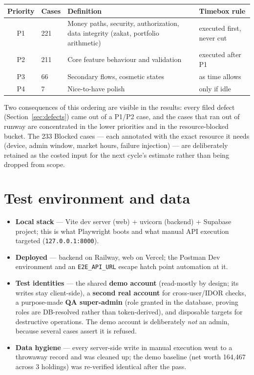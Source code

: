 \documentclass[11pt,a4paper]{article}
\begin{document}
\begin{center}
\small
\begin{tabularx}{\textwidth}{clLl}
\toprule
\textbf{Priority} & \textbf{Cases} & \textbf{Definition} & \textbf{Timebox rule} \\
\midrule
P1 & 221 & Money paths, security, authorization, data integrity (zakat, portfolio arithmetic) & executed first, never cut \\
P2 & 211 & Core feature behaviour and validation & executed after P1 \\
P3 & 66 & Secondary flows, cosmetic states & as time allows \\
P4 & 7 & Nice-to-have polish & only if idle \\
\bottomrule
\end{tabularx}
\end{center}

Two consequences of this ordering are visible in the results: every filed
defect (Section~\ref{sec:defects}) came out of a P1/P2 case, and the cases that
ran out of runway are concentrated in the lower priorities and in the
resource-blocked bucket. The 233 Blocked cases --- each annotated with the
exact resource it needs (device, admin window, market hours, failure
injection) --- are deliberately retained as the costed input for the next
cycle's estimate rather than being dropped from scope.

\section{Test environment and data}

\begin{itemize}
  \item \textbf{Local stack} --- Vite dev server (web) + uvicorn (backend) +
        Supabase project; this is what Playwright boots and what manual API
        execution targeted (\texttt{127.0.0.1:8000}).
  \item \textbf{Deployed} --- backend on Railway, web on Vercel; the Postman Dev
        environment and an \texttt{E2E\_API\_URL} escape hatch point automation at it.
  \item \textbf{Test identities} --- the shared \textbf{demo account} (read-mostly by
        design; its writes stay client-side), a \textbf{second real account} for
        cross-user/IDOR checks, a purpose-made \textbf{QA super-admin} (role granted
        in the database, proving roles are DB-resolved rather than
        token-derived), and disposable targets for destructive operations. The
        demo account is deliberately \emph{not} an admin, because several cases
        assert it is refused.
  \item \textbf{Data hygiene} --- every server-side write in manual execution went
        to a throwaway record and was cleaned up; the demo baseline (net worth
        164{,}467 across 3 holdings) was re-verified identical after the pass.
\end{itemize}
\end{document}
